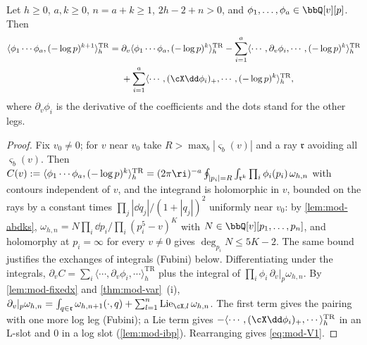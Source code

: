 \begin{prop}
\label{prop:mod-V1}
Let $h\geq 0$, $a,k\geq 0$, $n=a+k\geq 1$, $2h-2+n>0$, and $\phi_1,\dots,\phi_a\in\bbQ[v][p]$. Then
\begin{equation}
\label{eq:mod-V1}
\begin{aligned}
\langle\phi_1\cdots\phi_a,(-\log p)^{k+1}\rangle^{\mathrm{TR}}_h={}&\partial_v\langle\phi_1\cdots\phi_a,(-\log p)^k\rangle^{\mathrm{TR}}_h-\sum_{i=1}^a\langle\cdots,\partial_v\phi_i,\cdots,(-\log p)^k\rangle^{\mathrm{TR}}_h\\
&+\sum_{i=1}^a\langle\cdots,(\cX\dd\phi_i)_+,\cdots,(-\log p)^k\rangle^{\mathrm{TR}}_h ,
\end{aligned}
\end{equation}
where $\partial_v\phi_i$ is the derivative of the coefficients and the dots stand for the other legs.
\end{prop}

\begin{proof}
Fix $v_0\neq 0$; for $v$ near $v_0$ take $R>\max_b|\varsigma_b(v)|$ and a ray $\mathfrak r$ avoiding all $\varsigma_b(v)$. Then $C(v):=\langle\phi_1\cdots\phi_a,(-\log p)^k\rangle^{\mathrm{TR}}_h=(2\pi\ri)^{-a}\oint_{|p_i|=R}\int_{\mathfrak r^k}\prod_i\phi_i(p_i)\,\omega_{h,n}$ with contours independent of $v$, and the integrand is holomorphic in $v$, bounded on the rays by a constant times $\prod_j|\dd q_j|/(1+|q_j|)^2$ uniformly near $v_0$: by \cref{lem:mod-abdks}, $\omega_{h,n}=N\prod_i\dd p_i/\prod_i(p_i^5-v)^K$ with $N\in\bbQ[v][p_1,\dots,p_n]$, and holomorphy at $p_i=\infty$ for every $v\neq0$ gives $\deg_{p_i}N\leq5K-2$. The same bound justifies the exchanges of integrals (Fubini) below. Differentiating under the integrals, $\partial_vC=\sum_i\langle\cdots,\partial_v\phi_i,\cdots\rangle^{\mathrm{TR}}_h$ plus the integral of $\prod_i\phi_i\,\partial_v|_p\omega_{h,n}$. By \cref{lem:mod-fixedx} and \cref{thm:mod-var}~(i), $\partial_v|_p\omega_{h,n}=\int_{q\in\mathfrak r}\omega_{h,n+1}(\cdot,q)+\sum_{l=1}^n\mathrm{Lie}_{\cX,l}\,\omega_{h,n}$. The first term gives the pairing with one more log leg (Fubini); a Lie term gives $-\langle\cdots,(\cX\dd\phi_i)_+,\cdots\rangle^{\mathrm{TR}}_h$ in an L-slot and $0$ in a log slot (\cref{lem:mod-ibp}). Rearranging gives \eqref{eq:mod-V1}.
\end{proof}


